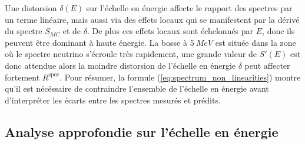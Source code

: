\bigbreak

Une distorsion $\delta(E)$ sur l'échelle en énergie affecte le rapport des spectres par un terme linéaire, mais aussi via des effets locaux qui se manifestent par la dérivé du spectre $S_{MC}$ et de $\delta$. De plus ces effets locaux sont échelonnés par $E$, donc ils peuvent être dominant à haute énergie. La bosse à $\SI{5}{MeV}$ est située dans la zone où le spectre neutrino s'écroule très rapidement, une grande valeur de $S'(E)$ est donc attendue alors la moindre distorsion de l'échelle en énergie $\delta$ peut affecter fortement $R^\textrm{spec}$. Pour résumer, la formule (\ref{eq:spectrum_non_linearities}) montre qu'il est nécéssaire de contraindre l'ensemble de l'échelle en énergie avant d'interpréter les écarts entre les spectres mesurés et prédits.\\







\bigbreak

\subsection{Analyse approfondie sur l'échelle en énergie}

%


